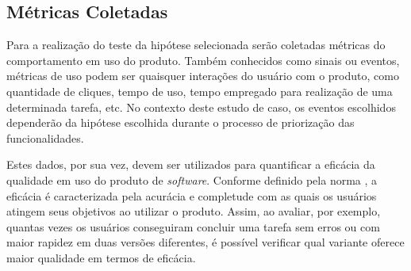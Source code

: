 \subsection{Métricas Coletadas}

Para a realização do teste da hipótese selecionada serão coletadas métricas do comportamento em uso do produto. Também conhecidos como sinais ou eventos, métricas de uso podem ser quaisquer interações do usuário com o produto, como quantidade de cliques, tempo de uso, tempo empregado para realização de uma determinada tarefa, etc. No contexto deste estudo de caso, os eventos escolhidos dependerão da hipótese escolhida durante o processo de priorização das funcionalidades.

Estes dados, por sua vez, devem ser utilizados para quantificar a eficácia da qualidade em uso do produto de \textit{software}. Conforme definido pela norma , a eficácia é caracterizada pela acurácia e completude com as quais os usuários atingem seus objetivos ao utilizar o produto. Assim, ao avaliar, por exemplo, quantas vezes os usuários conseguiram concluir uma tarefa sem erros ou com maior rapidez em duas versões diferentes, é possível verificar qual variante oferece maior qualidade em termos de eficácia.



